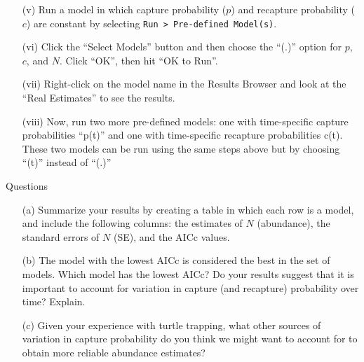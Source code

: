 \documentclass[12pt]{article}
\begin{document}
\begin{enumerate}
  \item[(v)] Run a model in which capture probability ($p$) and
    recapture probability ($c$) are constant by selecting
    \verb+Run > Pre-defined Model(s)+.
  \item[(vi)] Click the ``Select Models'' button and then choose the
    ``(.)'' option for $p$, $c$, and $N$. Click ``OK'', then hit ``OK
    to Run''.  
  \item[(vii)] Right-click on the model name in the Results Browser
    and look at the ``Real Estimates'' to see the results. 
  \item[(viii)]	Now, run two more pre-defined models: one with
    time-specific capture probabilities ``p(t)'' and one with
    time-specific recapture probabilities c(t). These two models can
    be run using the same steps above but by choosing ``(t)'' instead
    of ``(.)'' 
\end{enumerate}


Questions

\begin{enumerate}
  \item[(a)] Summarize your results by creating a table in which each row
    is a model, and include the following columns: the estimates of $N$
    (abundance), the standard errors of $N$ (SE), and the AICc values.
  \item[(b)] The model with the lowest AICc is considered the best in
    the set of models. Which model has the lowest AICc? Do your
    results suggest that it is important to account for variation in
    capture (and recapture) probability over time? Explain.
  \item[(c)] Given your experience with turtle trapping, what other
    sources of variation in capture probability do you think we might
    want to account for to obtain more reliable abundance estimates?
\end{enumerate}
\end{document}
